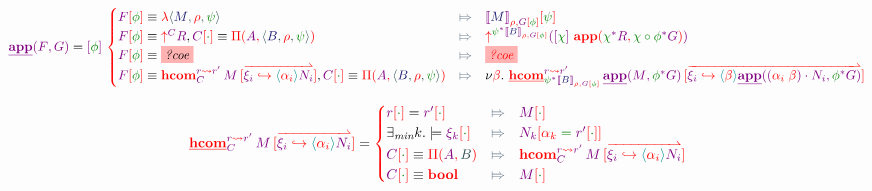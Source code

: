 \documentclass{article}
\newcommand\Eval[2]{
  \FmtFam{
    {\left\llbracket\FmtTm{#1}\right\rrbracket}_{\FmtVal{#2}}
  }
}
\begin{document}
\[
  \SemApp{F}{G}
  =
  \Fam{\phi}{
    \begin{cases}
      \Cond{
        \FamTest{F}{\phi}
        \equiv
        \VLam{
          \VClo{M}{\rho}{\psi}
        }
      }{
        \FamTest{
          \Eval{M}{\rho, \FamTest{G}{\phi}}
        }{
          \psi
        }
      }
      \\
      \Cond{
        \FamTest{F}{\phi}
        \equiv
        \VUp{C}{R},
        \FamTest{C}{\RstId}\equiv \VPi{A}{\VClo{B}{\rho}{\psi}}
      }{
        \VUp{
          \Rst{\psi}{\Eval{B}{\rho,\FamTest{G}{\phi}}}
        }{
          \Parens*{
            \Fam{\chi}{
              \VApp{
                \Rst{\chi}{R}
              }{
                \Rst{\chi\circ\phi}{G}
              }
            }
          }
        }
      }
      \\
      \Cond{
        \FamTest{F}{\phi}
        \equiv
        \Hole{coe}
      }{
        \Hole{coe}
      }
      \\
      \Cond{
        \FamTest{F}{\phi}
        \equiv
        \VHCom{r}{r'}{C}{M}{
          \Vec{
            \VFace{\xi_i}{
              \VAbs{\alpha_i}{N_i}
            }
          }
        },
        \FamTest{C}{\RstId}\equiv
        \VPi{A}{\VClo{B}{\rho}{\psi}}
      }{
        \Fresh{\beta}{
          \SemHCom{r}{r'}{
            \Rst{\psi}{\Eval{B}{\rho,\FamTest{G}{\phi}}}
          }{
            \SemApp{M}{\Rst{\phi}{G}}
          }{
            \Vec{
              \VFace{\xi_i}{
                \VAbs{\beta}{
                  \SemApp{
                    \Act{
                      \Swap{\alpha_i}{\beta}
                    }{N_i}
                  }{
                    \Rst{\phi}{G}
                  }
                }
              }
            }
          }
        }
      }
    \end{cases}
  }
\]

\[
  \SemHCom{r}{r'}{C}{M}{
    \Vec{
      \VFace{\xi_i}{\VAbs{\alpha_i}{N_i}}
    }
  }
  =
  \FmtVal{
    \begin{cases}
      \Cond{
        \FamTest{r}{\RstId}=\FamTest{r'}{\RstId}
      }{
        \FamTest{M}{\RstId}
      }
      \\
      \Cond{
        \exists_{\textit{min}}k.\models\FamTest{\xi_k}{\RstId}
      }{
        \FamTest{N_k}{
          \RstEquate{\alpha_k}{\FamTest{r'}{\RstId}}
        }
      }
      \\
      \Cond{
        \FamTest{C}{\RstId}
        \equiv
        \VPi{A}{B}
      }{
        \VHCom{r}{r'}{C}{M}{
          \Vec{
            \VFace{\xi_i}{\VAbs{\alpha_i}{N_i}}
          }
        }
      }
      \\
      \Cond{
        \FamTest{C}{\RstId}\equiv\VBool
      }{
        \FamTest{M}{\RstId}
      }
    \end{cases}
  }
\]
\end{document}
